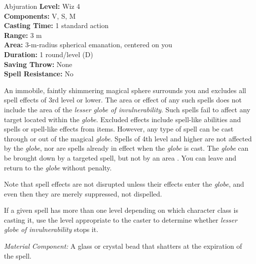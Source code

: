 {Abjuration}
{
	\textbf{Level:}
	Wiz 4\\
	\textbf{Components:}
	V, S, M\\
	\textbf{Casting Time:}
	1 standard action\\
	\textbf{Range:}
	3 m\\
	\textbf{Area:}
	3-m-radius spherical emanation, centered on you\\
	\textbf{Duration:}
	1 round/level (D)\\
	\textbf{Saving Throw:}
	None\\
	\textbf{Spell Resistance:}
	No\\
}
{
	An immobile, faintly shimmering magical sphere surrounds you and excludes all spell effects of 3rd level or lower. The area or effect of any such spells does not include the area of the \emph{lesser globe of invulnerability}. Such spells fail to affect any target located within the \emph{globe}. Excluded effects include spell-like abilities and spells or spell-like effects from items. However, any type of spell can be cast through or out of the magical \emph{globe}. Spells of 4th level and higher are not affected by the \emph{globe}, nor are spells already in effect when the \emph{globe} is cast. The \emph{globe} can be brought down by a targeted  spell, but not by an area . You can leave and return to the \emph{globe} without penalty.

	Note that spell effects are not disrupted unless their effects enter the \emph{globe}, and even then they are merely suppressed, not dispelled.

	If a given spell has more than one level depending on which character class is casting it, use the level appropriate to the caster to determine whether \emph{lesser globe of invulnerability} stops it.

	\textit{Material Component:}
	A glass or crystal bead that shatters at the expiration of the spell.

}
